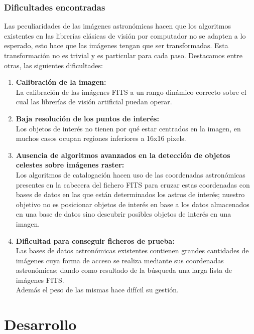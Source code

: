 	\subsubsection{Dificultades encontradas}
	Las peculiaridades de las imágenes astronómicas hacen que los algoritmos existentes en las librerías clásicas de visión por computador no se adapten a lo esperado, esto hace que las imágenes tengan que ser transformadas. Esta transformación no es trivial y es particular para cada paso.
	\newline
	Destacamos entre otras, las siguientes dificultades:
	\begin{enumerate}
	\item \textbf{Calibración de la imagen:}\\
	La calibración de las imágenes FITS a un rango dinámico correcto sobre el cual las librerías de visión artificial puedan operar.
	\item \textbf{Baja resolución de los puntos de interés:}\\
	Los objetos de interés no tienen por qué estar centrados en la imagen, en muchos casos ocupan regiones inferiores a 16x16 pixels. 
	\item \textbf{Ausencia de algoritmos avanzados en la detección de objetos celestes sobre imágenes raster:}\\
	Los algoritmos de catalogación hacen uso de las coordenadas astronómicas presentes en la cabecera del fichero FITS para cruzar estas coordenadas con bases de datos en las que están determinados los astros de interés; nuestro objetivo no es posicionar objetos de interés en base a los datos almacenados en una base de datos sino descubrir posibles objetos de interés en una imagen.
	\item \textbf{Dificultad para conseguir ficheros de prueba:} \\
	Las bases de datos astronómicas existentes contienen grandes cantidades de imágenes cuya forma de acceso se realiza mediante sus coordenadas astronómicas; dando como resultado de la búsqueda una larga lista de imágenes FITS.\\Además el peso de las mismas hace difícil su gestión.
	\end{enumerate}

	\section{Desarrollo}
